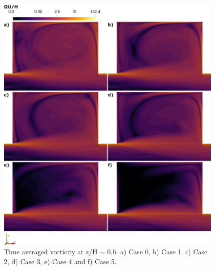 \begin{figure}[!htb]
\centering
\includegraphics[width=\linewidth]{../images/art4/vorticityMean1.jpeg}
\caption{Time averaged vorticity at z/H = 0.6: a) Case 0, b) Case 1, c) Case 2, d) Case 3, e) Case 4 and f) Case 5.}
\label{fig:art4:vorticityMean1}
\end{figure}

